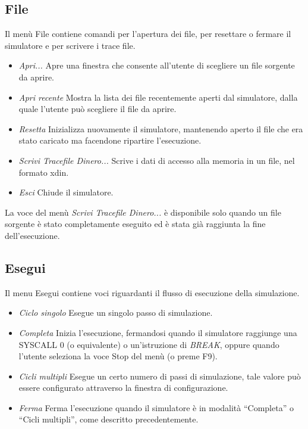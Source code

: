 \documentclass[letterpaper,10pt,english]{sphinxmanual}
\begin{document}
\subsection{File}
\label{user-interface:file}
Il menù File contiene comandi per l'apertura dei file, per resettare o
fermare il simulatore e per scrivere i trace file.
\begin{itemize}
\item {} 
\emph{Apri...} Apre una finestra che consente all'utente di scegliere un file
sorgente da aprire.

\item {} 
\emph{Apri recente} Mostra la lista dei file recentemente aperti dal simulatore,
dalla quale l'utente può scegliere il file da aprire.

\item {} 
\emph{Resetta} Inizializza nuovamente il simulatore, mantenendo aperto il file
che era stato caricato ma facendone ripartire l'esecuzione.

\item {} 
\emph{Scrivi Tracefile Dinero...} Scrive i dati di accesso alla memoria in un
file, nel formato xdin.

\item {} 
\emph{Esci} Chiude il simulatore.

\end{itemize}

La voce del menù \emph{Scrivi Tracefile Dinero...} è disponibile solo quando un
file sorgente è stato completamente eseguito ed è stata già raggiunta la fine
dell'esecuzione.


\subsection{Esegui}
\label{user-interface:esegui}
Il menu Esegui contiene voci riguardanti il flusso di esecuzione della
simulazione.
\begin{itemize}
\item {} 
\emph{Ciclo singolo} Esegue un singolo passo di simulazione.

\item {} 
\emph{Completa} Inizia l'esecuzione, fermandosi quando il simulatore
raggiunge una SYSCALL 0 (o equivalente) o un'istruzione di \emph{BREAK},
oppure quando l'utente seleziona la voce Stop del menù (o preme F9).

\item {} 
\emph{Cicli multipli} Esegue un certo numero di passi di simulazione, tale
valore può essere configurato attraverso la finestra di configurazione.

\end{itemize}
\begin{itemize}
\item {} 
\emph{Ferma} Ferma l'esecuzione quando il simulatore è in modalità
``Completa'' o ``Cicli multipli'', come descritto precedentemente.

\end{itemize}
\end{document}
